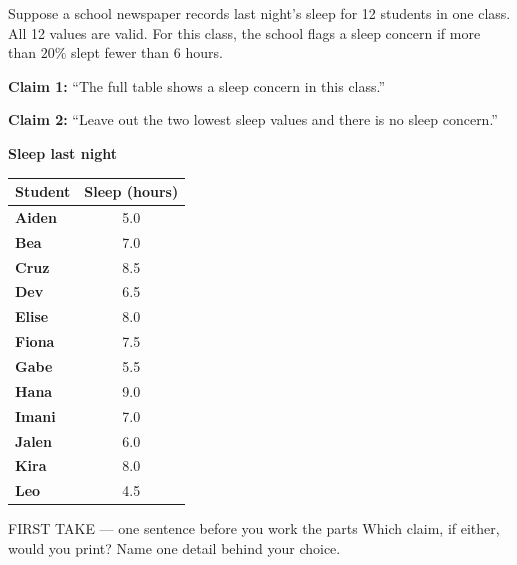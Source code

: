 \documentclass[14pt]{extarticle}
\begin{document}
\pagestyle{empty}


\noindent\begin{minipage}[t]{0.57\linewidth}
\vspace{0pt}
Suppose a school newspaper records last night's sleep for 12 students in one class. All 12 values are valid. For this class, the school flags a sleep concern if more than $20\%$ slept fewer than 6 hours.\par\smallskip \textbf{Claim 1:} ``The full table shows a sleep concern in this class.''\par \textbf{Claim 2:} ``Leave out the two lowest sleep values and there is no sleep concern.''\par
\end{minipage}\hfill
\begin{minipage}[t]{0.40\linewidth}
\vspace{0pt}
\begin{center}
\textbf{Sleep last night}\par\smallskip
\begin{tabular}{|l|c|}
\hline
\textbf{Student} & \textbf{Sleep (hours)} \\ \hline
\textbf{Aiden} & 5.0 \\ \hline
\textbf{Bea} & 7.0 \\ \hline
\textbf{Cruz} & 8.5 \\ \hline
\textbf{Dev} & 6.5 \\ \hline
\textbf{Elise} & 8.0 \\ \hline
\textbf{Fiona} & 7.5 \\ \hline
\textbf{Gabe} & 5.5 \\ \hline
\textbf{Hana} & 9.0 \\ \hline
\textbf{Imani} & 7.0 \\ \hline
\textbf{Jalen} & 6.0 \\ \hline
\textbf{Kira} & 8.0 \\ \hline
\textbf{Leo} & 4.5 \\ \hline
\end{tabular}
\end{center}
\end{minipage}

\begin{firsttakebox}{FIRST TAKE --- one sentence before you work the parts}
Which claim, if either, would you print? Name one detail behind your choice.
\end{firsttakebox}
\end{document}
